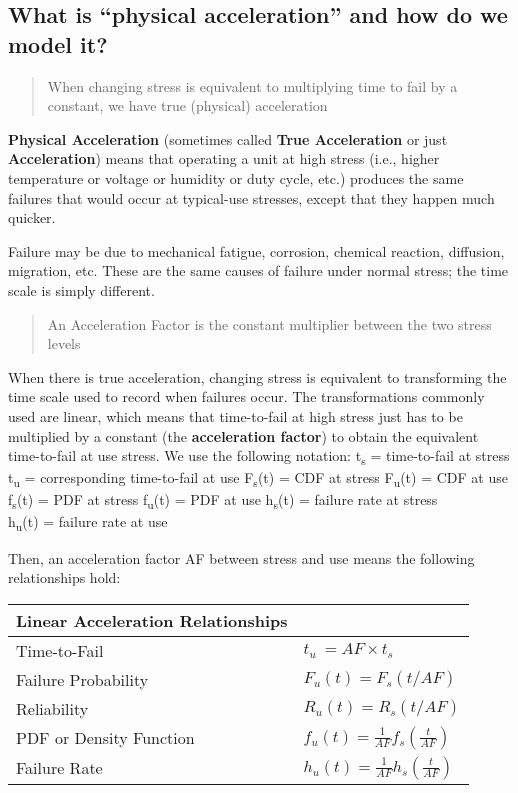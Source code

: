 \documentclass[]{book}
\theoremstyle{definition}
\theoremstyle{definition}
\theoremstyle{definition}
\theoremstyle{remark}
\begin{document}
\subsection{\texorpdfstring{What is ``physical acceleration'' and how do
we model
it?}{What is physical acceleration and how do we model it?}}\label{what-is-physical-acceleration-and-how-do-we-model-it}

\begin{quote}
When changing stress is equivalent to multiplying time to fail by a
constant, we have true (physical) acceleration
\end{quote}

\textbf{Physical Acceleration} (sometimes called \textbf{True
Acceleration} or just \textbf{Acceleration}) means that operating a unit
at high stress (i.e., higher temperature or voltage or humidity or duty
cycle, etc.) produces the same failures that would occur at typical-use
stresses, except that they happen much quicker.

Failure may be due to mechanical fatigue, corrosion, chemical reaction,
diffusion, migration, etc. These are the same causes of failure under
normal stress; the time scale is simply different.

\begin{quote}
An Acceleration Factor is the constant multiplier between the two stress
levels
\end{quote}

When there is true acceleration, changing stress is equivalent to
transforming the time scale used to record when failures occur. The
transformations commonly used are linear, which means that time-to-fail
at high stress just has to be multiplied by a constant (the
\textbf{acceleration factor}) to obtain the equivalent time-to-fail at
use stress. We use the following notation: t\textsubscript{s} =
time-to-fail at stress\\
t\textsubscript{u} = corresponding time-to-fail at use
F\textsubscript{s}(t) = CDF at stress F\textsubscript{u}(t) = CDF at use
f\textsubscript{s}(t) = PDF at stress f\textsubscript{u}(t) = PDF at use
h\textsubscript{s}(t) = failure rate at stress\\
h\textsubscript{u}(t) = failure rate at use

Then, an acceleration factor AF between stress and use means the
following relationships hold:

\begin{longtable}[]{@{}ll@{}}
\toprule
Linear Acceleration Relationships &\tabularnewline
\midrule
\endhead
Time-to-Fail & \(t_u~=AF\times t_s\)\tabularnewline
Failure Probability & \(F_u(t)=F_s(t/AF)\)\tabularnewline
Reliability & \(R_u(t)=R_s(t/AF)\)\tabularnewline
PDF or Density Function &
\(f_u(t)=\frac{1}{AF} f_s(\frac{t}{AF})\)\tabularnewline
Failure Rate & \(h_u(t)=\frac{1}{AF} h_s(\frac{t}{AF})\)\tabularnewline
\bottomrule
\end{longtable}
\end{document}
